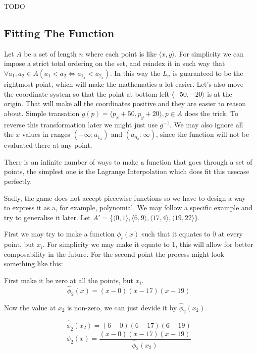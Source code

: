 \documentclass[12pt, titlepage]{article}
\newcommand{\TODO}{\begin{center}\color{red}TODO\end{center}}
\begin{document}
\TODO{}

\subsection{Fitting The Function}
Let $A$ be a set of length $n$ where each point is like $\langle x, y \rangle$.
For simplicity we can impose a strict total ordering on the set, and reindex
it in such way that $\forall a_1,a_2 \in A (a_1 < a_2 \Leftrightarrow a_{1_x} < 
a_{2_x})$. In this way the $L_n$ is guaranteed to be the rightmost point, which
will make the mathematics a lot easier. Let's also move the coordinate system
so that the point at bottom left $\langle -50, -20 \rangle$ is at the origin.
That will make all the coordinates positive and they are easier to reason about.
Simple transation $g(p) = \langle p_x + 50, p_y + 20 \rangle, p \in A$ does the
trick. To reverse this transformation later we might just use $g^{-1}$. We may
also ignore all the $x$ values in ranges 
$(-\infty; a_{1_x})$ and $(a_{n_x}; \infty)$, since the function will not be 
evaluated there at any point.

There is an infinite number of ways to make a function that goes through a set of
points, the simplest one is the Lagrange Interpolation which does fit this 
usecase perfectly.

Sadly, the game does not accept piecewise functions so we have to design a
way to express it as a, for example, polynomial.
We may follow a specific example and try to generalise it later. 
Let $A' = \{\langle 0, 1 \rangle, \langle 6, 9 \rangle, 
\langle 17, 4 \rangle, \langle 19, 22 \rangle\}$.

First we may try to make a function $\phi_i(x)$ such that it equates to 0 at
every point, but $x_i$. For simplicity we may make it equate to 1, this will
allow for better composability in the future. For the second point the process
might look something like this:

First make it be zero at all the points, but $x_i$.
\begin{equation}
    \hat{\phi}_2(x) = (x - 0)(x - 17)(x - 19)
\end{equation}

Now the value at $x_2$ is non-zero, we can just devide it by $\hat{\phi}_2(x_2)$.

\begin{equation}
    \hat{\phi}_2(x_2) = (6 - 0)(6 - 17)(6 - 19)
\end{equation}
\begin{equation}
    \phi_2(x) = \frac{(x - 0)(x - 17)(x - 19)}{\hat{\phi}_2(x_2)}
\end{equation}
\end{document}
